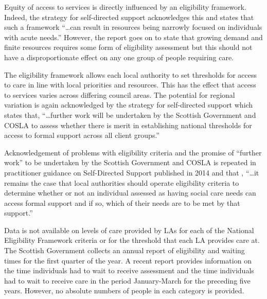 \documentclass[12pt,]{report}
\begin{document}
Equity of access to services is directly influenced by an eligibility
framework. Indeed, the strategy for self-directed support
\citep[pp.20]{RN171} acknowledges this and states that such a framework
``\ldots{}can result in resources being narrowly focused on individuals
with acute needs.'' However, the report goes on to state that growing
demand and finite resources requires some form of eligibility assessment
but this should not have a disproportionate effect on any one group of
people requiring care.

The eligibility framework allows each local authority to set thresholds
for access to care in line with local priorities and resources. This has
the effect that access to services varies across differing council
areas. The potential for regional variation is again acknowledged by the
strategy for self-directed support \citep[pp.20]{RN171} which states
that, ``\ldots{}further work will be undertaken by the Scottish
Government and COSLA to assess whether there is merit in establishing
national thresholds for access to formal support across all client
groups.''

Acknowledgement of problems with eligibility criteria and the promise of
``further work'' to be undertaken by the Scottish Government and COSLA
is repeated in practitioner guidance on Self-Directed Support published
in 2014 \citep[pp.19]{RN170} and that , ``\ldots{}it remains the case
that local authorities should operate eligibility criteria to determine
whether or not an individual assessed as having social care needs can
access formal support and if so, which of their needs are to be met by
that support.''

Data is not available on levels of care provided by LAs for each of the
National Eligibility Framework criteria or for the threshold that each
LA provides care at. The Scottish Government collects an annual report
of eligibility and waiting times for the first quarter of the year. A
recent report \citep{RN184} provides information on the time individuals
had to wait to receive assessment and the time individuals had to wait
to receive care in the period January-March for the preceding five
years. However, no absolute numbers of people in each category is
provided.
\end{document}

